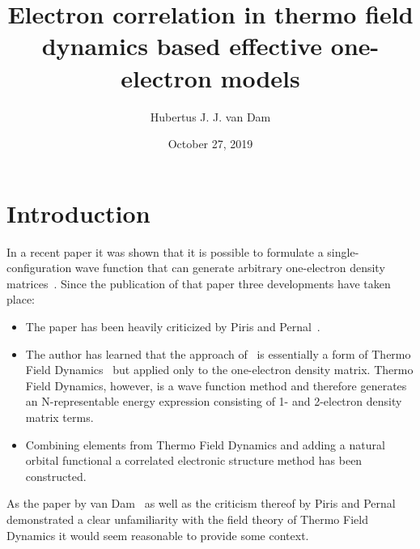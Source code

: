 \documentclass[pra]{revtex4-1}
\begin{document}
\title{Electron correlation in thermo field dynamics based effective one-electron models}
\author{Hubertus J. J. van Dam}
\date{October 27, 2019}

\begin{abstract}
\end{abstract}

\maketitle

\section{Introduction}

In a recent paper it was shown that it is possible to formulate a 
single-configuration wave function that can generate arbitrary one-electron
density matrices~\cite{van_Dam_2016}. Since the publication of that paper
three developments have taken place:
\begin{itemize}
\item The paper has been heavily criticized by Piris and Pernal~\cite{Piris_2017}.
\item The author has learned that the approach of~\cite{van_Dam_2016} is
      essentially a form of Thermo Field
      Dynamics~\cite{TAKAHASHI_1996, Umezawa:1982, das2000topics}
      but applied only to the 
      one-electron density matrix. Thermo Field Dynamics, however, 
      is a wave function method and therefore generates an N-representable
      energy expression consisting of 1- and 2-electron density matrix terms.
\item Combining elements from Thermo Field Dynamics and adding a natural
      orbital functional a correlated electronic structure method has been
      constructed.
\end{itemize}
As the paper by van Dam~\cite{van_Dam_2016} as well as the criticism thereof by
Piris and Pernal~\cite{Piris_2017} demonstrated a clear unfamiliarity with the
field theory of Thermo Field Dynamics it would seem reasonable to provide some
context. 
\end{document}
